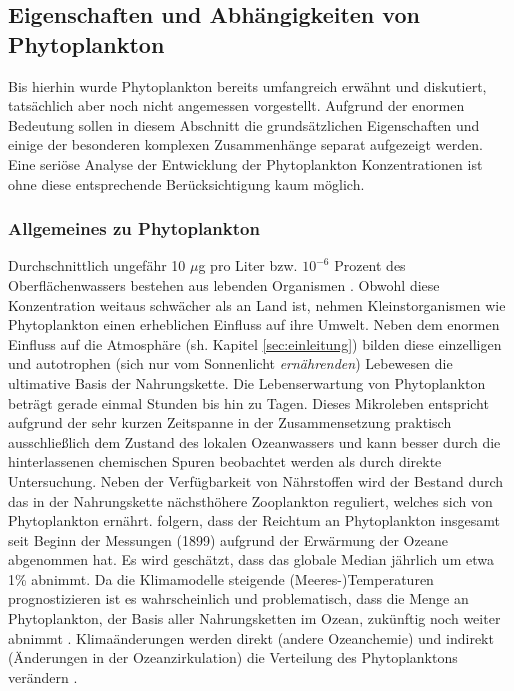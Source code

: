 \documentclass[12pt,a4paper,onecolumn]{scrartcl}
\begin{document}
\subsection{Eigenschaften und Abhängigkeiten von Phytoplankton} \label{sec:Phytoplankton}
Bis hierhin wurde Phytoplankton bereits umfangreich erwähnt und diskutiert, tatsächlich aber noch nicht angemessen vorgestellt. Aufgrund der enormen Bedeutung sollen in diesem Abschnitt die grundsätzlichen Eigenschaften und einige der besonderen komplexen Zusammenhänge separat aufgezeigt werden. Eine seriöse Analyse der Entwicklung der Phytoplankton Konzentrationen ist ohne diese entsprechende Berücksichtigung kaum möglich.
\subsubsection{Allgemeines zu Phytoplankton} \label{sec:Phytobasics}
Durchschnittlich ungefähr 10 $\mu$g pro Liter bzw. $10^{-6}$ Prozent des Oberflächenwassers bestehen aus lebenden Organismen \citep{Emerson.2009}. Obwohl diese Konzentration weitaus schwächer als an Land ist, nehmen Kleinstorganismen wie Phytoplankton einen erheblichen Einfluss auf ihre Umwelt. Neben dem enormen Einfluss auf die Atmosphäre (sh. Kapitel \ref{sec:einleitung}) bilden diese einzelligen und autotrophen (sich nur vom Sonnenlicht \textit{ernährenden}) Lebewesen die ultimative Basis der Nahrungskette. Die Lebenserwartung von Phytoplankton beträgt gerade einmal Stunden bis hin zu Tagen. Dieses Mikroleben entspricht aufgrund der sehr kurzen Zeitspanne in der Zusammensetzung praktisch ausschließlich dem Zustand des lokalen Ozeanwassers und kann besser durch die hinterlassenen chemischen Spuren beobachtet werden als durch direkte Untersuchung. Neben der Verfügbarkeit von Nährstoffen wird der Bestand durch das in der Nahrungskette nächsthöhere Zooplankton reguliert, welches sich von Phytoplankton ernährt. \citet{Boyce.2010} folgern, dass der Reichtum an Phytoplankton insgesamt seit Beginn der Messungen (1899) aufgrund der Erwärmung der Ozeane abgenommen hat. Es wird geschätzt, dass das globale Median jährlich um etwa 1\% abnimmt. Da die Klimamodelle steigende (Meeres-)Temperaturen prognostizieren ist es wahrscheinlich und problematisch, dass die Menge an Phytoplankton, der Basis aller Nahrungsketten im Ozean, zukünftig noch weiter abnimmt \citep{Siegel.2010}. Klimaänderungen werden direkt (andere Ozeanchemie) und indirekt (Änderungen in der Ozeanzirkulation) die Verteilung des Phytoplanktons verändern \citep{Falkowski.1998}.  
\end{document}
